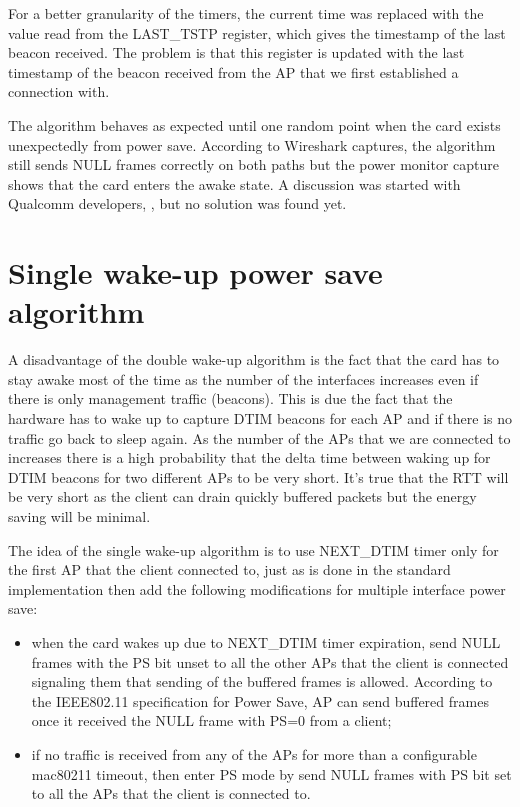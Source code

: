 For a better granularity of the timers, the current time was replaced with the value read from the LAST_TSTP register, which gives the timestamp of the last beacon received. The problem is that this register is updated with the last timestamp of the beacon received from the AP that we first established a connection with. 

The algorithm behaves as expected until one random point when the card exists unexpectedly from power save. According to Wireshark captures, the algorithm still sends NULL frames correctly on both paths but the power monitor capture shows that the card enters the awake state. A discussion was started with Qualcomm developers, \cite{cite-bugps}, but no solution was found yet.

\section{Single wake-up power save algorithm}
\label{sec:singlewakeup}

A disadvantage of the double wake-up algorithm is the fact that the card has to stay awake most of the time as the number of the interfaces increases even if there is only management traffic (beacons). This is due the fact that the hardware has to wake up to capture DTIM beacons for each AP and if there is no traffic go back to sleep again. As the number of the APs that we are connected to increases there is a high probability that the delta time between waking up for DTIM beacons for two different APs to be very short. It's true that the RTT will be very short as the client can drain quickly buffered packets but the energy saving will be minimal.

The idea of the single wake-up algorithm is to use NEXT_DTIM timer only for the first AP that the client connected to, just as is done in the standard implementation then add the following modifications for multiple interface power save: 

\begin{itemize}
\item when the card wakes up due to NEXT_DTIM timer expiration, send NULL frames with the PS bit unset to all the other APs that the client is connected signaling them that sending of the buffered frames is allowed. According to the IEEE802.11 specification for Power Save, AP can send buffered frames once it received the NULL frame with PS=0 from a client;
\item if no traffic is received from any of the APs for more than a configurable mac80211 timeout, then enter PS mode by send NULL frames with PS bit set to all the APs that the client is connected to. 
\end{itemize}

